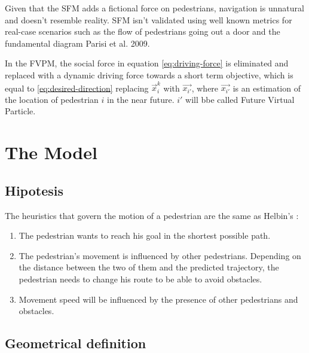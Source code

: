 \documentclass[draftclsnofoot]{IEEEtran}
\begin{document}
Given that the SFM adds a fictional force on pedestrians, navigation is unnatural and doesn't resemble reality.
SFM isn't validated using well known metrics for real-case scenarios
such as the flow of pedestrians going out a door and the fundamental diagram {Parisi et al. 2009}.

In the FVPM, the social force in equation \ref{eq:driving-force} is eliminated and replaced with a dynamic driving force towards a short term objective, which is equal to \ref{eq:desired-direction} replacing $\vec{x}_{i}^{k}$ with $\vec{x_{i'}}$, where $\vec{x_{i'}}$ is an estimation of the location 
of pedestrian $i$ in the near future. $i'$ will bbe called Future Virtual Particle.

\section{The Model}

\subsection{Hipotesis}

The heuristics that govern the motion of a pedestrian are the same
as Helbin's \cite{key-helb1995,key-helb2000}:

\begin{enumerate}
    \item The pedestrian wants to reach his goal in the shortest possible path. 
    \item The pedestrian's movement is influenced by other pedestrians. Depending
    on the distance between the two of them and the predicted trajectory,
    the pedestrian needs to change his route to be able to avoid
    obstacles.
    \item Movement speed will be influenced by the presence of other pedestrians
and obstacles.
\end{enumerate}

\subsection{Geometrical definition}
\end{document}
